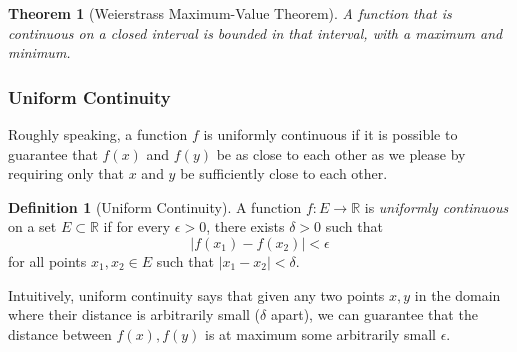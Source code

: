 \documentclass{article}
\newtheorem{theorem}{Theorem}[section]
\theoremstyle{remark}
\theoremstyle{definition}
\newtheorem{definition}{Definition}[section]
\begin{document}
\begin{theorem}[Weierstrass Maximum-Value Theorem]
A function that is continuous on a closed interval is bounded in that interval, with a maximum and minimum. 
\end{theorem}

\subsubsection{Uniform Continuity}
Roughly speaking, a function $f$ is uniformly continuous if it is possible to guarantee that $f(x)$ and $f(y)$ be as close to each other as we please by requiring only that $x$ and $y$ be sufficiently close to each other. 

\begin{definition}[Uniform Continuity]
A function $f: E \longrightarrow \mathbb{R}$ is \textit{uniformly continuous} on a set $E \subset \mathbb{R}$ if for every $\epsilon > 0$, there exists $\delta > 0$ such that 
\[\big| f(x_1) - f(x_2)\big| < \epsilon\]
for all points $x_1, x_2 \in E$ such that $|x_1 - x_2| < \delta$. 

Intuitively, uniform continuity says that given any two points $x, y$ in the domain where their distance is arbitrarily small ($\delta$ apart), we can guarantee that the distance between $f(x), f(y)$ is at maximum some arbitrarily small $\epsilon$. 


\end{definition}
\end{document}
